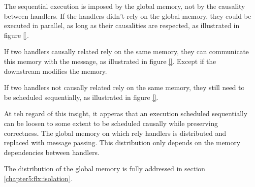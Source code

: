 The sequential execution is imposed by the global memory, not by the causality between handlers.
If the handlers didn't rely on the global memory, they could be executed in parallel, as long as their causalities are respected, as illustrated in figure \ref{}.

If two handlers causally related rely on the same memory, they can communicate this memory with the message, as illustrated in figure \ref{}.
Except if the downstream modifies the memory.

If two handlers not causally related rely on the same memory, they still need to be scheduled sequentially, as illustrated in figure \ref{}.

At teh regard of this insight, it apperas that an execution scheduled sequentially can be loosen to some extent to be scheduled causally while preserving correctness.
The global memory on which rely handlers is distributed and replaced with message passing.
This distribution only depends on the memory dependencies between handlers.


The distribution of the global memory is fully addressed in section \ref{chapter5:flx:isolation}.
















